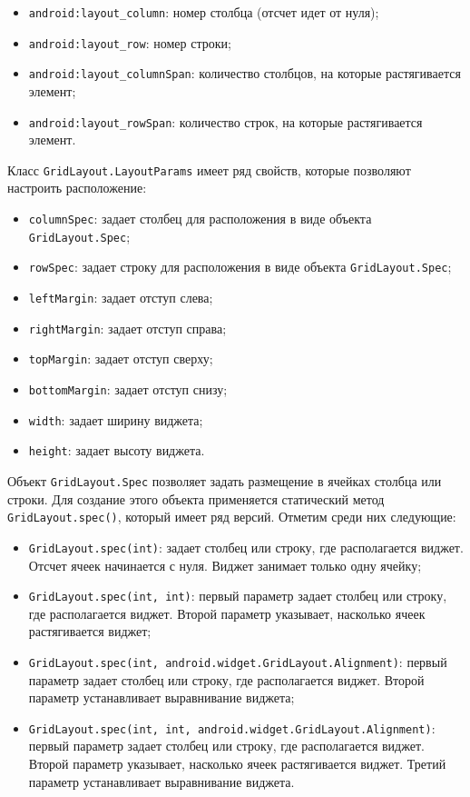 \begin{itemize}
	\item \texttt{android:layout\_column}: номер столбца (отсчет идет от нуля);
	\item \texttt{android:layout\_row}: номер строки;
	\item \texttt{android:layout\_columnSpan}: количество столбцов, на которые 
		растягивается элемент;
	\item \texttt{android:layout\_rowSpan}: количество строк, на которые 
		растягивается элемент.
\end{itemize}

Класс \texttt{GridLayout.LayoutParams} имеет ряд свойств, которые позволяют 
настроить расположение: 

\begin{itemize}
	\item \texttt{columnSpec}: задает столбец для расположения
		в виде объекта \texttt{GridLayout.Spec};
	\item \texttt{rowSpec}: задает строку для расположения
		в виде объекта \texttt{GridLayout.Spec};
	\item \texttt{leftMargin}: задает отступ слева;
	\item \texttt{rightMargin}: задает отступ справа;
	\item \texttt{topMargin}: задает отступ сверху;
	\item \texttt{bottomMargin}: задает отступ снизу;
	\item \texttt{width}: задает ширину виджета;
	\item \texttt{height}: задает высоту виджета. 
\end{itemize}

Объект \texttt{GridLayout.Spec} позволяет задать размещение в ячейках 
столбца или строки. Для создание этого объекта применяется статический 
метод \texttt{GridLayout.spec()}, который имеет ряд версий.
Отметим среди них следующие:

\begin{itemize}
	\item \texttt{GridLayout.spec(int)}: задает столбец или строку,
		где располагается виджет. Отсчет ячеек начинается с нуля.
		Виджет занимает только одну ячейку;
	\item \texttt{GridLayout.spec(int, int)}: первый параметр задает столбец
		или строку, где располагается виджет. Второй параметр указывает,
		насколько ячеек растягивается виджет;
	\item \texttt{GridLayout.spec(int, android.widget.GridLayout.Alignment)}:
		первый параметр задает столбец или строку, где располагается виджет.
		Второй параметр устанавливает выравнивание виджета;
	\item \texttt{GridLayout.spec(int, int,
		android.widget.GridLayout.Alignment)}: первый параметр задает столбец
		или строку, где располагается виджет. Второй параметр указывает,
		насколько ячеек растягивается виджет. Третий параметр устанавливает
		выравнивание виджета.
\end{itemize}



